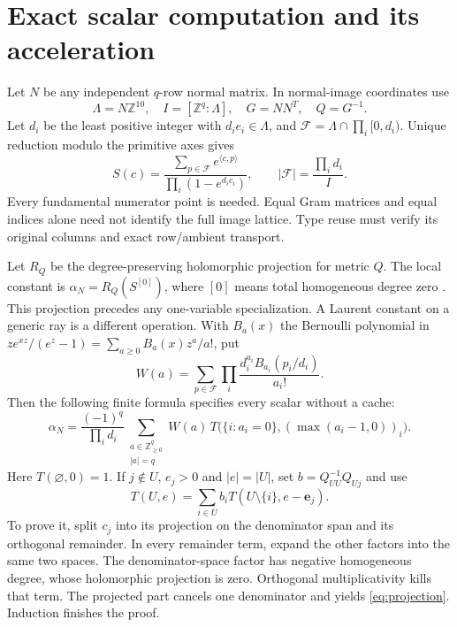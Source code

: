 \documentclass[11pt]{article}
\theoremstyle{definition}\newtheorem{definition}[theorem]{Definition}
\theoremstyle{remark}\newtheorem{remark}[theorem]{Remark}
\newcommand{\Z}{\mathbb Z}\newcommand{\Q}{\mathbb Q}\newcommand{\R}{\mathbb R}
\begin{document}
\section{Exact scalar computation and its acceleration}\label{sec:scalar}
Let \(N\) be any independent \(q\)-row normal matrix. In normal-image
coordinates use
\[
 \Lambda=N\Z^{10},\quad I=[\Z^q:\Lambda],\quad
 G=NN^T,\quad Q=G^{-1}.
\]
Let \(d_i\) be the least positive integer with \(d_i e_i\in\Lambda\),
and \(\mathcal F=\Lambda\cap\prod_i[0,d_i)\). Unique reduction modulo
the primitive axes gives
\begin{equation}\label{eq:series}
 S(c)=\frac{\sum_{p\in\mathcal F}e^{\langle c,p\rangle}}
 {\prod_i(1-e^{d_i c_i})},\qquad
 |\mathcal F|=\frac{\prod_i d_i}{I}.
\end{equation}
Every fundamental numerator point is needed. Equal Gram matrices and equal
indices alone need not identify the full image lattice. Type reuse must
verify its original columns and exact row/ambient transport.

Let \(R_Q\) be the degree-preserving holomorphic projection for metric
\(Q\). The local constant is
\(\alpha_N=R_Q(S^{[0]})\), where \([0]\) means total homogeneous degree
zero \cite{bvasym,gpz}. This projection precedes any one-variable
specialization. A Laurent constant on a generic ray is a different operation.
With \(B_a(x)\) the Bernoulli polynomial in
\(ze^{xz}/(e^z-1)=\sum_{a\geq0}B_a(x)z^a/a!\), put
\[
 W(a)=\sum_{p\in\mathcal F}\prod_i
 \frac{d_i^{a_i}B_{a_i}(p_i/d_i)}{a_i!}.
\]
Then the following finite formula specifies every scalar without a cache:
\begin{equation}\label{eq:direct}
 \alpha_N=\frac{(-1)^q}{\prod_i d_i}
 \sum_{\substack{a\in\Z_{\geq0}^q\\|a|=q}}
 W(a)\,T\bigl(\{i:a_i=0\},(\max(a_i-1,0))_i\bigr).
\end{equation}
Here \(T(\varnothing,0)=1\). If \(j\notin U\), \(e_j>0\) and
\(|e|=|U|\), set \(b=Q_{UU}^{-1}Q_{Uj}\) and use
\begin{equation}\label{eq:projection}
 T(U,e)=\sum_{i\in U}b_iT(U\setminus\{i\},e-\mathbf e_j).
\end{equation}
To prove it, split \(c_j\) into its projection on the denominator span
and its orthogonal remainder. In every remainder term, expand the other
factors into the same two spaces. The denominator-space factor has negative
homogeneous degree, whose holomorphic projection is zero. Orthogonal
multiplicativity kills that term. The projected part cancels one denominator
and yields \eqref{eq:projection}. Induction finishes the proof.
\end{document}
